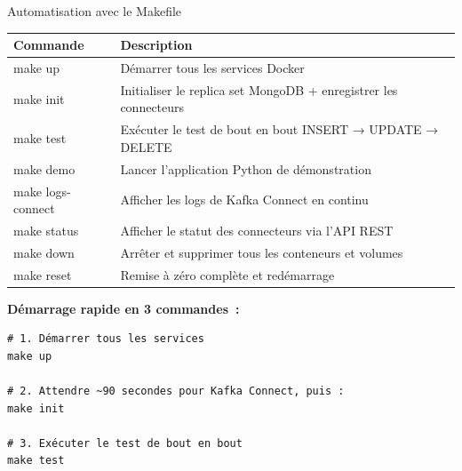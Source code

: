 \documentclass[aspectratio=169]{beamer}
\begin{document}
\begin{frame}[fragile]{Automatisation avec le Makefile}
  \begin{center}
    \footnotesize
    \begin{tabular}{@{}>{\ttfamily}l l@{}}
      \toprule
      \textbf{Commande} & \textbf{Description} \\
      \midrule
      make up             & Démarrer tous les services Docker \\
      make init           & Initialiser le replica set MongoDB + enregistrer les connecteurs \\
      make test           & Exécuter le test de bout en bout INSERT → UPDATE → DELETE \\
      make demo           & Lancer l'application Python de démonstration \\
      make logs-connect   & Afficher les logs de Kafka Connect en continu \\
      make status         & Afficher le statut des connecteurs via l'API REST \\
      make down           & Arrêter et supprimer tous les conteneurs et volumes \\
      make reset          & Remise à zéro complète et redémarrage \\
      \bottomrule
    \end{tabular}
  \end{center}

  \vspace{0.3cm}
  \textbf{\color{accent} Démarrage rapide en 3 commandes~:}
  \begin{tcolorbox}[codebox]
\begin{verbatim}
# 1. Démarrer tous les services
make up

# 2. Attendre ~90 secondes pour Kafka Connect, puis :
make init

# 3. Exécuter le test de bout en bout
make test
\end{verbatim}
  \end{tcolorbox}
\end{frame}
\end{document}
